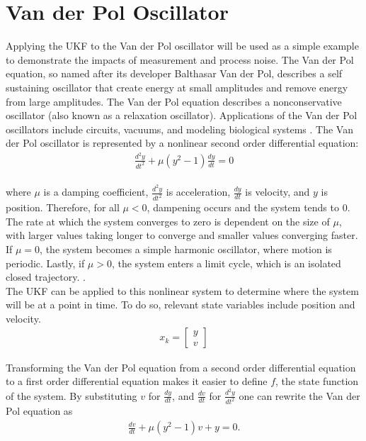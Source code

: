 \section{Van der Pol Oscillator}
\label{Van der Pol Oscillator}


Applying the UKF to the Van der Pol oscillator will be used as a simple example to demonstrate the impacts of measurement and process noise. The Van der Pol equation, so named after its developer Balthasar Van der Pol, describes a self sustaining oscillator that create energy at small amplitudes and remove energy from large amplitudes. The Van der Pol equation describes a nonconservative oscillator (also known as a relaxation oscillator). Applications of the Van der Pol oscillators include circuits, vacuums, and modeling biological systems
 \cite{weisstein_2019}. The Van der Pol oscillator is represented by a nonlinear second order differential equation: 
\begin{align*}
\frac{d^2y}{dt^2} + \mu(y^2-1)\frac{dy}{dt} = 0
\end{align*}   \\
where $\mu$ is a damping coefficient, $\frac{d^2y}{dt^2}$ is acceleration, $\frac{dy}{dt}$ is velocity, and $y$ is position. Therefore, for all $\mu < 0$, dampening occurs and the system tends to 0. The rate at which the system converges to zero is dependent on the size of $\mu$, with larger values taking longer to converge and smaller values converging faster. If $\mu = 0$, the system becomes a simple harmonic oscillator, where motion is periodic. Lastly, if $\mu > 0$, the system enters a limit cycle, which is an isolated closed trajectory. \cite{kinoshita_2013}. \\ 

\noindent The UKF can be applied to this nonlinear system to determine where the system will be at a point in time. To do so, relevant state variables include position and velocity. 
\begin{align*}
x_k = \begin{bmatrix}
          y\\ 
          v
           \end{bmatrix}  
\end{align*}


\noindent Transforming the Van der Pol equation from a second order differential equation to a first order differential equation makes it easier to define $f$, the state function of the system. By substituting $v$ for $\frac{dy}{dt}$, and $ \frac{dv}{dt} $ for  $\frac{d^2y}{dt^2}$ one can rewrite the Van der Pol equation as 
  \begin{align*}
 	\frac{dv}{dt}  +\mu(y ^2-1)v + y = 0.
 \end{align*}

